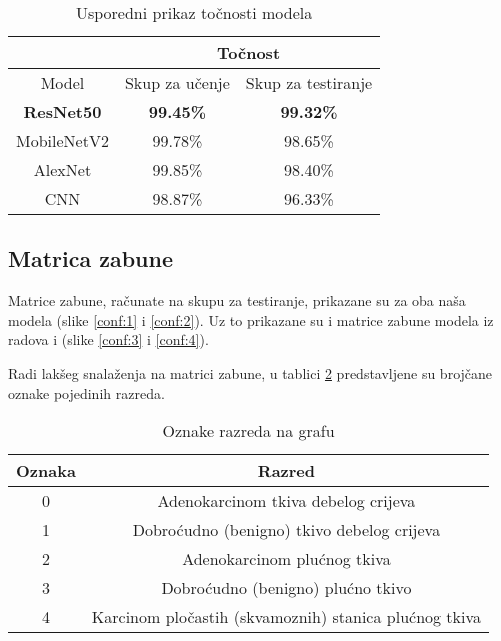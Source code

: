 \documentclass[conference, utf8]{IEEEtran}
\begin{document}
	\begin{table}[H]
		\centering
		\caption{Usporedni prikaz točnosti modela}
		\label{table:1}
		\begin{tabular}{ |c|c|c| } 
			\hline
			& \multicolumn{2}{c|}{Točnost} \\
			\hline
			Model & Skup za učenje  & Skup za testiranje \\
			\hline \hline
			\textbf{ResNet50} & \textbf{99.45\%}  & \textbf{99.32\%}  \\
			\hline
			MobileNetV2 & 99.78\%  & 98.65\%  \\
			\hline
			AlexNet\cite{RAD1} & 99.85\%  & 98.40\%  \\
			\hline
			CNN\cite{RAD2} & 98.87\% & 96.33\%  \\
			\hline
		\end{tabular}
	\end{table}

	\subsection{Matrica zabune}
	Matrice zabune, računate na skupu za testiranje, prikazane su za oba naša modela (slike \ref{conf:1} i \ref{conf:2}). Uz to prikazane su i matrice zabune modela iz radova \cite{RAD1} i \cite{RAD2} (slike \ref{conf:3} i \ref{conf:4}).
	
	Radi lakšeg snalaženja na matrici zabune, u tablici \ref{table:3} predstavljene su brojčane oznake pojedinih razreda.
	
	\begin{table}[H]
		\centering
		\caption{Oznake razreda na grafu}
		\label{table:3}
		\begin{tabular}{ |c|c| } 
			\hline
			Oznaka & Razred \\
			\hline \hline
			0 & Adenokarcinom tkiva debelog crijeva \\
			\hline
			1 & Dobroćudno (benigno) tkivo debelog crijeva \\
			\hline
			2 & Adenokarcinom plućnog tkiva \\
			\hline
			3 & Dobroćudno (benigno) plućno tkivo \\
			\hline
			4 & Karcinom pločastih (skvamoznih) stanica plućnog tkiva \\
			\hline
		\end{tabular}
	\end{table}
	
\end{document}
